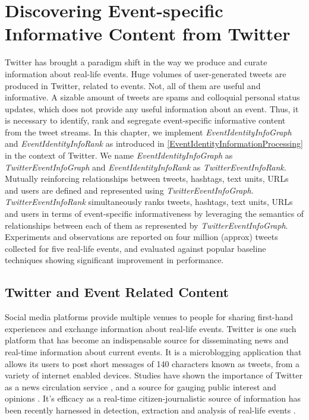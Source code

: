 
\chapter{Discovering Event-specific Informative Content from Twitter} %

\label{TwitterStudy} %


Twitter has brought a paradigm shift in the way we produce and curate information about real-life events. Huge volumes of user-generated tweets are produced in Twitter, related to events. Not, all of them are useful and informative. A sizable amount of tweets are spams and colloquial personal status updates, which does not provide any useful information about an event.  Thus, it is necessary to identify, rank and segregate event-specific informative content from the tweet streams. In this chapter, we implement \textit{EventIdentityInfoGraph} and \textit{EventIdentityInfoRank} as introduced in \ref{EventIdentityInformationProcessing} in the context of Twitter. We name \textit{EventIdentityInfoGraph} as \textit{TwitterEventInfoGraph} and \textit{EventIdentityInfoRank} as \textit{TwitterEventInfoRank}. Mutually reinforcing relationships between tweets, hashtags, text units, URLs and users are defined and represented using \textit{TwitterEventInfoGraph}. \textit{TwitterEventInfoRank} simultaneously ranks tweets, hashtags, text units, URLs and users in terms of event-specific informativeness by leveraging the semantics of relationships between each of them as represented by \textit{TwitterEventInfoGraph}. Experiments and observations are reported on four million (approx) tweets collected for five real-life events, and evaluated against popular baseline techniques showing significant improvement in performance. 

\section{Twitter and Event Related Content}

\noindent Social media platforms provide multiple venues to people for sharing first-hand experiences and exchange information about real-life events. Twitter is one such platform that has become an indispensable source for disseminating news and real-time information about current events. It is a microblogging application that allows its users to post short messages of 140 characters known as tweets, from a variety of internet enabled devices. Studies have shown the importance of Twitter as a news circulation service \cite{phelan2009using}, and a source for gauging public interest and opinions \cite{o2010tweets}. It's efficacy as a real-time citizen-journalistic source of information has been recently harnessed in detection, extraction and analysis of real-life events \cite{sakaki2013tweet,popescu2011extracting,purohit2013twitris}.

